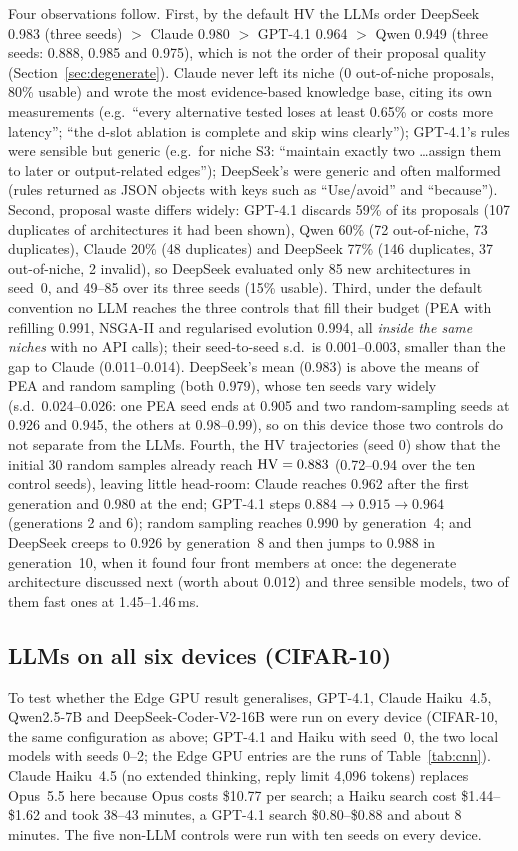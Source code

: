 Four observations follow. First, by the default HV the LLMs order DeepSeek 0.983 (three seeds) $>$ Claude 0.980 $>$ GPT-4.1 0.964 $>$ Qwen 0.949 (three seeds: 0.888, 0.985 and 0.975), which is not the order of their proposal quality (Section~\ref{sec:degenerate}). Claude never left its niche (0 out-of-niche proposals, 80\% usable) and wrote the most evidence-based knowledge base, citing its own measurements (e.g.\ ``every alternative tested loses at least 0.65\% or costs more latency''; ``the d-slot ablation is complete and skip wins clearly''); GPT-4.1's rules were sensible but generic (e.g.\ for niche S3: ``maintain exactly two  \ldots assign them to later or output-related edges''); DeepSeek's were generic and often malformed (rules returned as JSON objects with keys such as ``Use/avoid'' and ``because''). Second, proposal waste differs widely: GPT-4.1 discards 59\% of its proposals (107 duplicates of architectures it had been shown), Qwen 60\% (72 out-of-niche, 73 duplicates), Claude 20\% (48 duplicates) and DeepSeek 77\% (146 duplicates, 37 out-of-niche, 2 invalid), so DeepSeek evaluated only 85 new architectures in seed~0, and 49--85 over its three seeds (15\% usable). Third, under the default convention no LLM reaches the three controls that fill their budget (PEA with refilling 0.991, NSGA-II and regularised evolution 0.994, all \emph{inside the same niches} with no API calls); their seed-to-seed s.d.\ is 0.001--0.003, smaller than the gap to Claude (0.011--0.014). DeepSeek's mean (0.983) is above the means of PEA and random sampling (both 0.979), whose ten seeds vary widely (s.d.\ 0.024--0.026: one PEA seed ends at 0.905 and two random-sampling seeds at 0.926 and 0.945, the others at 0.98--0.99), so on this device those two controls do not separate from the LLMs. Fourth, the HV trajectories (seed 0) show that the initial 30 random samples already reach $\mathrm{HV}=0.883$ (0.72--0.94 over the ten control seeds), leaving little head-room: Claude reaches 0.962 after the first generation and 0.980 at the end; GPT-4.1 steps $0.884\!\to\!0.915\!\to\!0.964$ (generations 2 and 6); random sampling reaches 0.990 by generation~4; and DeepSeek creeps to 0.926 by generation~8 and then jumps to 0.988 in generation~10, when it found four front members at once: the degenerate architecture discussed next (worth about 0.012) and three sensible models, two of them fast ones at 1.45--1.46\,ms.

\subsection{LLMs on all six devices (CIFAR-10)}\label{sec:multidevice}
To test whether the Edge GPU result generalises, GPT-4.1, Claude Haiku~4.5, Qwen2.5-7B and DeepSeek-Coder-V2-16B were run on every device (CIFAR-10, the same configuration as above; GPT-4.1 and Haiku with seed~0, the two local models with seeds 0--2; the Edge GPU entries are the runs of Table~\ref{tab:cnn}). Claude Haiku~4.5 (no extended thinking, reply limit 4{,}096 tokens) replaces Opus~5.5 here because Opus costs \$10.77 per search; a Haiku search cost \$1.44--\$1.62 and took 38--43 minutes, a GPT-4.1 search \$0.80--\$0.88 and about 8 minutes. The five non-LLM controls were run with ten seeds on every device.

